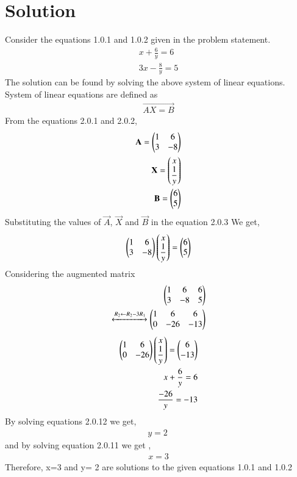 \documentclass[journal,12pt,twocolumn]{IEEEtran}
\begin{document}
\section{Solution}
Consider the equations 1.0.1 and 1.0.2 given in the problem statement.
\begin{align}
x+\displaystyle\frac{6}{y}=6\\
3x-\displaystyle\frac{8}{y}=5
\end{align}
The solution can be found by solving the above system of linear equations.\\ 
System of linear equations are defined as 
\begin{align}
\vec{AX=B}
\end{align}
From the equations 2.0.1 and 2.0.2, 
\begin{align}
\vec{A}= \myvec{1 &6\\3  & -8}\\
\medskip
\vec{X}= \myvec{ x\\ \displaystyle\frac{1}{y}}\\
\medskip
\vec{B}= \myvec{6\\5}  
\end{align} 
Substituting the values of $\vec{A}$, $\vec{X}$ and $\vec{B}$ in the equation 2.0.3
We get,
\begin{align}
\begin{pmatrix}1&6\\3&-8\end{pmatrix} \begin{pmatrix}x\\\displaystyle\frac{1}{y}\end{pmatrix}= \begin{pmatrix}6\\5\end{pmatrix}
\end{align}
Considering the augmented matrix 
 \begin{align}
  \begin{pmatrix}1&6&6\\3&-8&5\end{pmatrix}\\ 
 \xleftrightarrow[]{ R_2 \leftarrow R_2 - 3R_1}
  \begin{pmatrix}1&6&6\\0&-26&-13\end{pmatrix}
 \end{align}
 \begin{align}
\myvec{1&6\\0&-26} \myvec{x\\\displaystyle\frac{1}{y}}= \myvec{6\\-13}\\
\medskip
x+\displaystyle\frac{6}{y}= 6\\
\medskip
\displaystyle\frac{-26}{y}=-13
\end{align}
By solving equations 2.0.12 we get,
\begin{align}
y= 2\
\end{align}
and by solving equation 2.0.11 we get ,
\begin{align}
x=3
\end{align}
Therefore, x=3 and y= 2 are solutions to the given equations 1.0.1 and 1.0.2
\end{document}

